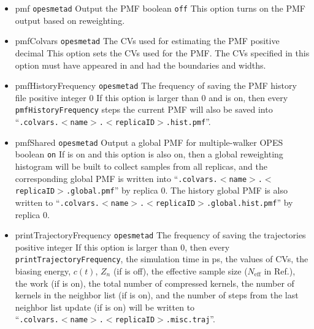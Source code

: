 \begin{itemize}
\item %
  \keydef
    {pmf}{%
    \texttt{opes{\textunderscore}metad}}{%
    Output the PMF}{%
    boolean}{%
    \texttt{off}}{%
    This option turns on the PMF output based on reweighting.}
\item %
  \key
    {pmfColvars}{%
    \texttt{opes{\textunderscore}metad}}{%
    The CVs used for estimating the PMF}{%
    positive decimal}{%
    This option sets the CVs used for the PMF. The CVs specified in this option must have appeared in  and had the boundaries and widths.}
\item %
  \keydef
    {pmfHistoryFrequency}{%
    \texttt{opes{\textunderscore}metad}}{%
    The frequency of saving the PMF history file}{%
    positive integer}{%
    0}{%
    If this option is larger than 0 and  is on, then every \texttt{pmfHistoryFrequency} steps the current PMF will also be saved into ``\outputName\texttt{.colvars.$<$name$>$.$<$replicaID$>$.hist.pmf}''.}
\item %
  \keydef
    {pmfShared}{%
    \texttt{opes{\textunderscore}metad}}{%
    Output a global PMF for multiple-walker OPES}{%
    boolean}{%
    \texttt{on}}{%
    If  is on and this option is also on, then a global reweighting histogram will be built to collect samples from all replicas, and the corresponding global PMF is written into ``\outputName\texttt{.colvars.$<$name$>$.$<$replicaID$>$.global.pmf}'' by replica 0. The history global PMF is also written to ``\outputName\texttt{.colvars.$<$name$>$.$<$replicaID$>$.global.hist.pmf}'' by replica 0.}
\item %
  \keydef
    {printTrajectoryFrequency}{%
    \texttt{opes{\textunderscore}metad}}{%
    The frequency of saving the trajectories}{%
    positive integer}{%
    }{%
    If this option is larger than 0, then every \texttt{printTrajectoryFrequency}, the simulation time in ps, the values of CVs, the biasing energy, $c(t)$, $Z_n$ (if  is off), the effective sample size ($N_{\mathrm{eff}}$ in Ref.\cite{Invernizzi2020}), the work (if  is on), the total number of compressed kernels, the number of kernels in the neighbor list (if  is on), and the number of steps from the last neighbor list update (if  is on) will be written to
    \\``\outputName\texttt{.colvars.$<$name$>$.$<$replicaID$>$.misc.traj}''.
    }
\end{itemize}

